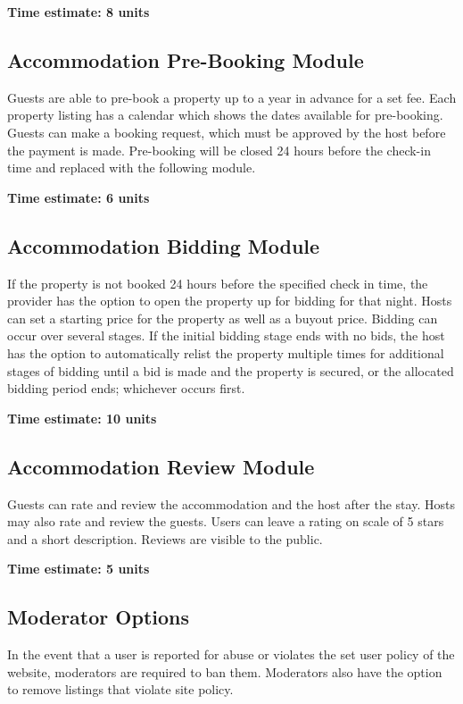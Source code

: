 \documentclass[12pt,a4paper]{article}
\begin{document}
\textbf{Time estimate: 8 units}

\subsection *{Accommodation Pre-Booking Module}

Guests are able to pre-book a property up to a year in advance for a set fee. Each property listing has a calendar which shows the dates available for pre-booking. Guests can make a booking request, which must be approved by the host before the payment is made. Pre-booking will be closed 24 hours before the check-in time and replaced with the following module.

\textbf{Time estimate: 6 units}

\subsection *{Accommodation Bidding Module}

If the property is not booked 24 hours before the specified check in time, the provider has the option to open the property up for bidding for that night. Hosts can set a starting price for the property as well as a buyout price. Bidding can occur over several stages. If the initial bidding stage ends with no bids, the host has the option to automatically relist the property multiple times for additional stages of bidding until a bid is made and the property is secured, or the allocated bidding period ends; whichever occurs first.

\textbf{Time estimate: 10 units}

\subsection *{Accommodation Review Module}

Guests can rate and review the accommodation and the host after the stay. Hosts may also rate and review the guests. Users can leave a rating on scale of 5 stars and a short description. Reviews are visible to the public.

\textbf{Time estimate: 5 units}

\subsection *{Moderator Options}

In the event that a user is reported for abuse or violates the set user policy of the website, moderators are required to ban them. Moderators also have the option to remove listings that violate site policy.
\end{document}

